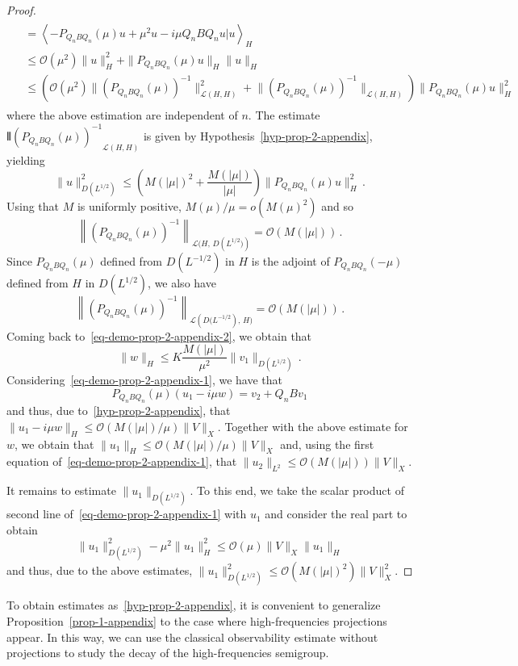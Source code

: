 \documentclass[10pt]{amsart}
\theoremstyle{definition}\newtheorem{defi}[theo]{Definition}\newtheorem{rema}[theo]{Remark}\newtheorem{exam}[theo]{Example}\newtheorem{exem}[theo]{Example}\newtheorem{nota}[theo]{Notation}
\newcommand{\Lc}{\mathcal{L}}
\newcommand{\Oc}{\mathcal{O}}
\DeclarePairedDelimiter{\VERT}{|\mkern -1.6mu|\mkern -1.6mu|}{|\mkern -1.6mu|\mkern -1.6mu|}
\begin{document}
\begin{proof}
\begin{multline*}
\begin{aligned}
&= \left\langle -P_{Q_n B Q_n}(\mu)u + \mu^2 u -i\mu Q_n B Q_n u|u\right\rangle_{H}\\
&\leq \Oc(\mu^2)\|u\|_{H}^2 + \|P_{Q_n B Q_n}(\mu)u\|_{H}\|u\|_H\\
&\leq\!\!\left(\Oc(\mu^2)\|(P_{Q_n B Q_n}(\mu))^{-1}\|^2_{\Lc(H,H)}\!+\!\|(P_{Q_n B Q_n}(\mu))^{-1}\|_{\Lc(H,H)}\right)
\|P_{Q_n B Q_n}(\mu)u\|_{H}^2
\end{aligned}
\end{multline*}
where the above estimation are independent of $n$. The estimate $\VERT{\!(P_{Q_n B Q_n}\!(\mu)\!)^{-1}}_{\!\Lc(H,H)}$ is given by Hypothesis~\eqref{hyp-prop-2-appendix}, yielding
\[
\|u\|_{D\left(L^{1/2}\right)}^2 \leq \left(M(|\mu|)^2 + \frac{M(|\mu|)}{|\mu|}\right)
\|P_{Q_n B Q_n}(\mu)u\|_{H}^2\,.
\]
Using that $M$ is uniformly positive, $M(\mu)/\mu=o(M(\mu)^2)$ and so
\[
\left\|(P_{Q_n B Q_n}(\mu))^{-1}\right\|_{\Lc(H,\,D\left(L^{1/2})\right)} = \Oc(M(|\mu|))\,.
\]
Since $P_{Q_n B Q_n}(\mu)$ defined from $D(L^{-1/2})$ in $H$ is the adjoint of $P_{Q_n B Q_n}(-\mu)$ defined from $H$ in $D(L^{1/2})$, we also have
\[
\left\|(P_{Q_n B Q_n}(\mu))^{-1}\right\|_{\Lc\left(D(L^{-1/2}\right),\,H)}=\Oc(M(|\mu|))\,.
\]
Coming back to~\eqref{eq-demo-prop-2-appendix-2}, we obtain that
\[
\|w\|_{H}\leq K\frac{M(|\mu|)}{\mu^2}\|v_1\|_{D\left(L^{1/2}\right)}\,.
\]
Considering~\eqref{eq-demo-prop-2-appendix-1}, we have that
\[
P_{Q_n B Q_n}(\mu)(u_1-i\mu w)=v_2+Q_n B v_1
\]
and thus, due to~\eqref{hyp-prop-2-appendix}, that $\|u_1-i\mu w\|_{H}\leq \Oc(M(|\mu|)/\mu) \|V\|_X$. Together with the above estimate for $w$, we obtain that $\|u_1\|_{H}\leq \Oc(M(|\mu|)/\mu)
\|V\|_X$ and, using the first equation of~\eqref{eq-demo-prop-2-appendix-1}, that $\|u_2\|_{L^2}\leq \Oc(M(|\mu|))\|V\|_X$.

It remains to estimate $\|u_1\|_{D(L^{1/2})}$. To this end, we take the scalar product of second line of~\eqref{eq-demo-prop-2-appendix-1} with $u_1$ and consider the real part to obtain
\[
\|u_1\|_{D(L^{1/2})}^2-\mu^2 \|u_1\|_{H}^2\leq
\Oc(\mu)\|V\|_X\|u_1\|_{H}
\]
and thus, due to the above estimates, $\|u_1\|_{D(L^{1/2})}^2 \leq
\Oc(M(|\mu|)^2) \|V\|^2_X$.
\end{proof}

To obtain estimates as~\eqref{hyp-prop-2-appendix}, it is convenient to generalize Proposition~\ref{prop-1-appendix} to the case where high-frequencies projections appear. In this way, we can use the classical observability estimate without projections to study the decay of the high-frequencies semigroup.
\end{document}
